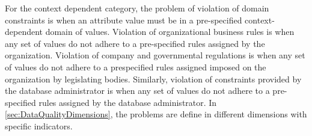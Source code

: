 \documentclass[pdftex,english,oribibl]{llncs}
\begin{document}
 For the context dependent category, the problem of violation of domain constraints is when an attribute value must be in a pre-specified context-dependent domain of values.
 Violation of organizational business rules is when any set of values do not adhere to a pre-specified rules assigned by the organization.
 Violation of company and governmental regulations is when any set of values do not adhere to a prespecified rules assigned imposed on the organization by legislating bodies.
 Similarly, violation of constraints provided by the database administrator is when any set of values do not adhere to a pre-specified rules assigned by the database administrator. In \ref{sec:DataQualityDimensions}, the problems are define in different dimensions with specific indicators.

\end{document}
